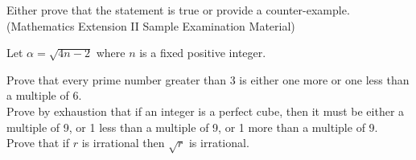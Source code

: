 \documentclass[11pt, a4paper, oneside]{exam}
\theoremstyle{definition}\newtheorem{define}{Definition}[section]
\theoremstyle{remark}\newtheorem{remark}{Remark}
\theoremstyle{definition}\newtheorem{example}{Example}[subsection]
\theoremstyle{definition}\newtheorem{notation}{Notation}[section]
\theoremstyle{definition}\newtheorem{theorem}{Theorem}[section]
\theoremstyle{definition}\newtheorem{corollary}{Corollary}[section]
\begin{document}
\begin{questions}
Either prove that the statement is true or provide a counter-example.\\

\question (Mathematics Extension II Sample Examination Material)

Let $\alpha = \sqrt{4n-2}$ where $n$ is a fixed positive integer.


\question[3] Prove that every prime number greater than 3 is either one more or one less than a multiple of 6.\\

\question[3] Prove by exhaustion that if an integer is a perfect cube, then it must be either a multiple of 9, or 1 less than a multiple of 9, or 1 more than a multiple of 9.\\


\question[3] Prove that if $r$ is irrational then $\sqrt{r}$ is irrational.\\







\end{questions}
\end{document}
